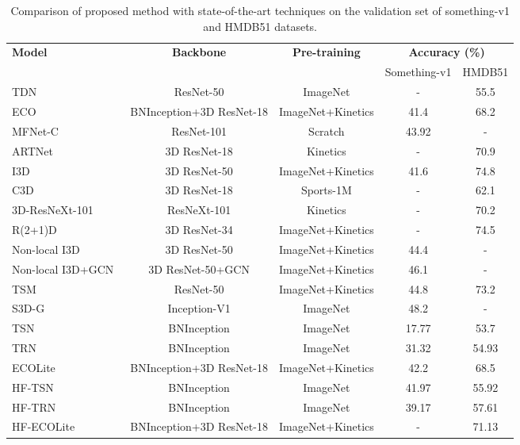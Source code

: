 \documentclass[journal,onecolumn]{IEEEtran}
\begin{document}
\begin{table}[h]
	\centering \begin{tabular}{|l|c|c|c|c|}
		\hline
	\multirow{2}{*}{\textbf{Model}} & \multirow{2}{*}{\textbf{Backbone}} & \multirow{2}{*}{\textbf{Pre-training}} & \multicolumn{2}{c|}{\textbf{Accuracy (\%)}} \\ \cline{4-5}
	& & & Something-v1 & HMDB51\\ \hline
	    TDN~\cite{tdn} & ResNet-50 & ImageNet & - & 55.5 \\ \hline
		ECO~\cite{eco} & BNInception+3D ResNet-18 & ImageNet+Kinetics & 41.4 & 68.2\\ \hline
		MFNet-C~\cite{lee2018motion} & ResNet-101 & Scratch & 43.92 & -\\ \hline
		ARTNet~\cite{wang2018appearance} & 3D ResNet-18 & Kinetics & - & 70.9 \\ \hline \hline
		I3D~\cite{carreira2017quo} & 3D ResNet-50 & ImageNet+Kinetics & 41.6 & 74.8\\ \hline
		C3D~\cite{tran2015learning} & 3D ResNet-18 & Sports-1M & - & 62.1 \\ \hline
		3D-ResNeXt-101~\cite{hara2018can} & ResNeXt-101 & Kinetics & - & 70.2 \\ \hline
		R(2+1)D~\cite{tran2018closer} & 3D ResNet-34 & ImageNet+Kinetics & - & 74.5 \\ \hline
		Non-local I3D~\cite{wang2018videos} & 3D ResNet-50 & ImageNet+Kinetics & 44.4 & -\\ \hline
		Non-local I3D+GCN~\cite{wang2018videos} & 3D ResNet-50+GCN & ImageNet+Kinetics & 46.1 & -\\ \hline
		TSM~\cite{tsm} & ResNet-50 & ImageNet+Kinetics & 44.8 & 73.2\\ \hline
		S3D-G~\cite{xie2018rethinking} & Inception-V1 & ImageNet & 48.2 & -\\ \hline \hline
		TSN~\cite{tsn} & BNInception & ImageNet & 17.77 & 53.7 \\ \hline
		TRN~\cite{trn} & BNInception & ImageNet & 31.32 & 54.93 \\ \hline 
		ECOLite~\cite{eco} & BNInception+3D ResNet-18 & ImageNet+Kinetics & 42.2 & 68.5\\ \hline \hline
		HF-TSN & BNInception & ImageNet & 41.97 & 55.92 \\ \hline
		HF-TRN & BNInception & ImageNet & 39.17 & 57.61 \\ \hline
		HF-ECOLite & BNInception+3D ResNet-18 & ImageNet+Kinetics & - & 71.13\\ \hline
	\end{tabular}\caption{Comparison of proposed method with state-of-the-art techniques on the validation set of something-v1 and HMDB51 datasets.}
	\label{tab:something_sota}
\end{table}
\end{document}
